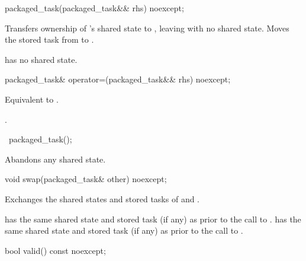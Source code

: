 %
\begin{itemdecl}
packaged_task(packaged_task&& rhs) noexcept;
\end{itemdecl}

\begin{itemdescr}
\pnum
\effects
Transfers ownership of
's shared state to , leaving  with no
shared state. Moves the stored task from  to .

\pnum
\ensures
{} has no shared state.
\end{itemdescr}

%
\begin{itemdecl}
packaged_task& operator=(packaged_task&& rhs) noexcept;
\end{itemdecl}

\begin{itemdescr}
\pnum
\effects
Equivalent to
.

\pnum
\returns
{}.
\end{itemdescr}

%
\begin{itemdecl}
~packaged_task();
\end{itemdecl}

\begin{itemdescr}
\pnum
\effects
Abandons any shared state.
\end{itemdescr}

%
\begin{itemdecl}
void swap(packaged_task& other) noexcept;
\end{itemdecl}

\begin{itemdescr}
\pnum
\effects
Exchanges the shared states and stored tasks of  and .

\pnum
\ensures
{} has the same shared state
and stored task (if any) as 
prior to the call to .  has the same shared state
and stored task (if any)
as  prior to the call to .
\end{itemdescr}

%
\begin{itemdecl}
bool valid() const noexcept;
\end{itemdecl}

